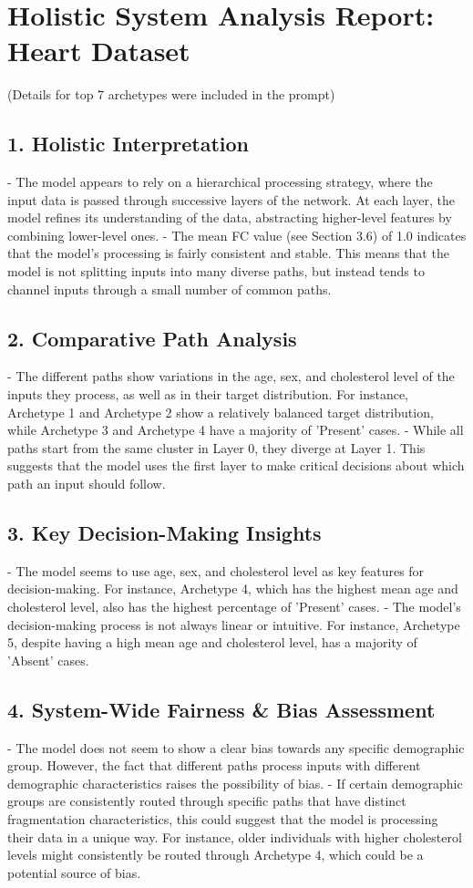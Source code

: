 \section*{Holistic System Analysis Report: Heart Dataset}
(Details for top 7 archetypes were included in the prompt)

\subsection*{1. Holistic Interpretation}
- The model appears to rely on a hierarchical processing strategy, where the input data is passed through successive layers of the network. At each layer, the model refines its understanding of the data, abstracting higher-level features by combining lower-level ones.
- The mean FC value (see Section 3.6) of 1.0 indicates that the model's processing is fairly consistent and stable. This means that the model is not splitting inputs into many diverse paths, but instead tends to channel inputs through a small number of common paths.

\subsection*{2. Comparative Path Analysis}
- The different paths show variations in the age, sex, and cholesterol level of the inputs they process, as well as in their target distribution. For instance, Archetype 1 and Archetype 2 show a relatively balanced target distribution, while Archetype 3 and Archetype 4 have a majority of 'Present' cases.
- While all paths start from the same cluster in Layer 0, they diverge at Layer 1. This suggests that the model uses the first layer to make critical decisions about which path an input should follow.

\subsection*{3. Key Decision-Making Insights}
- The model seems to use age, sex, and cholesterol level as key features for decision-making. For instance, Archetype 4, which has the highest mean age and cholesterol level, also has the highest percentage of 'Present' cases.
- The model's decision-making process is not always linear or intuitive. For instance, Archetype 5, despite having a high mean age and cholesterol level, has a majority of 'Absent' cases.

\subsection*{4. System-Wide Fairness \& Bias Assessment}
- The model does not seem to show a clear bias towards any specific demographic group. However, the fact that different paths process inputs with different demographic characteristics raises the possibility of bias.
- If certain demographic groups are consistently routed through specific paths that have distinct fragmentation characteristics, this could suggest that the model is processing their data in a unique way. For instance, older individuals with higher cholesterol levels might consistently be routed through Archetype 4, which could be a potential source of bias.

